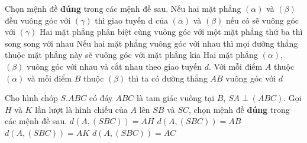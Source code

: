 \begin{ex}	 %
 
Chọn mệnh đề \textbf{đúng} trong các mệnh đề sau.
\choice
{\True Nếu hai mặt phẳng $( \alpha  )$ và $( \beta  )$ đều vuông góc với $( \gamma  )$ thì giao tuyến d của $( \alpha  )$ và $( \beta  )$ nếu có sẽ vuông góc với $( \gamma  )$}
{Hai mặt phẳng phân biệt cùng vuông góc với một mặt phẳng thứ ba thì song song với nhau}
{Nếu hai mặt phẳng vuông góc với nhau thì mọi đường thẳng thuộc mặt phẳng này sẽ vuông góc với mặt phẳng kia}
{Hai mặt phẳng $( \alpha  )$, $( \beta  )$ vuông góc với nhau và cắt nhau theo giao tuyến $ d $. Với mỗi điểm $ A $ thuộc $( \alpha  )$ và mỗi điểm $ B $ thuộc $( \beta  )$ thì ta có đường thẳng $ AB $ vuông góc với $ d $}
\end{ex}
\begin{ex}	  %
 
Cho hình chóp $ S.ABC $ có đáy $ ABC $ là tam giác vuông tại $ B $, $SA\perp ( ABC )$. Gọi $ H $ và $ K $ lần lượt là hình chiếu của $ A  $ lên $ SB $ và $ SC $, chọn mệnh đề \textbf{đúng} trong các mệnh đề sau.
 \choice
{\True $d( A,( SBC ) )=AH$}
{$d( A,( SBC ) )=AB$}
{$d( A,( SBC ) )=AK$}
{$d( A,( SBC ) )=AC$}
\end{ex}

